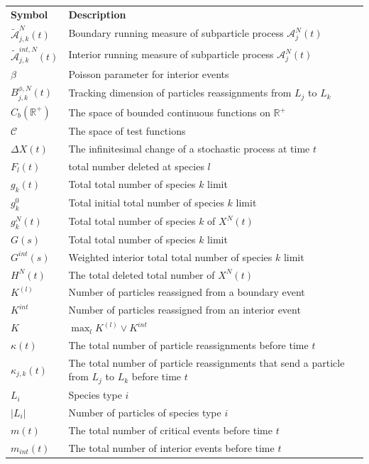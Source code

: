\begin{longtable}[l]{p{50pt}  p{300pt}} \textbf{Symbol}   & \textbf{Description} \\ $\tilde{\mathscr A}_{j,k}^N(t)$    & Boundary running measure of subparticle process $\mathscr A_{j}^N(t)$\\  
 $\tilde{\mathscr A}_{j,k}^{int,N}(t)$    & Interior running measure of subparticle process $\mathscr A_{j}^N(t)$\\ 
$\beta$ & Poisson parameter for interior events\\
$B_{j,k}^{\phi,N}(t)$ & Tracking dimension of particles reassignments from $L_j$ to $L_k$\\
$C_b(\mathbb{R}^+)$ & The space of bounded continuous functions on $\mathbb R^+$\\
$\mathcal C$ & The space of test functions \\
$\Delta X(t)$         & The infinitesimal change of a stochastic process at time $t$\\
 $F_l(t)$ & total number deleted at species $l$\\
$g_k(t)$ & Total total number of species $k$ limit\\
$g_k^0$ & Total initial total number of species $k$ limit\\
$g_k^N(t)$ & Total total number of species $k$ of $X^N(t)$\\
$G(s)$ & Total total number of species $k$ limit\\
$G^{int}(s)$ & Weighted interior total total number of species $k$ limit\\
$H^N(t)$ & The total deleted total number of $X^N(t)$ \\
$K^{(l)}$ & Number of particles reassigned from a boundary event\\ 
$K^{int}$ & Number of particles reassigned from an interior event\\ 
$K$ & $\max_l K^{(l)} \vee K^{int}$\\
$\kappa(t)$ & The total number of particle reassignments before time $t$\\
$\kappa_{j,k}(t)$ & The total number of particle reassignments that send a particle from $L_j$ to $L_k$ before time $t$\\
$L_{i}$    & Species type $i$ \\
$|L_{i}|$    & Number of particles of species type $i$ \\
$m(t)$ & The total number of critical events before time $t$\\
$m_{int}(t)$ & The total number of interior events before time $t$ \\

\end{longtable}
